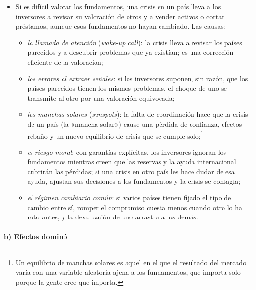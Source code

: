 \documentclass[11pt]{article}
\begin{document}
\begin{itemize}
\item Si es difícil valorar los fundamentos, una crisis en un país lleva a los inversores a revisar su valoración de otros y a vender activos o cortar préstamos, aunque esos fundamentos no hayan cambiado. Las causas:
  \begin{itemize}
  \item \emph{la llamada de atención} (\emph{wake-up call}): la crisis lleva a revisar los países parecidos y a descubrir problemas que ya existían; es una corrección eficiente de la valoración;
  \item \emph{los errores al extraer señales}: si los inversores suponen, sin razón, que los países parecidos tienen los mismos problemas, el choque de uno se transmite al otro por una valoración equivocada;
  \item \emph{las manchas solares} (\emph{sunspots}): la falta de coordinación hace que la crisis de un país (la «mancha solar») cause una pérdida de confianza, efectos rebaño y un nuevo equilibrio de crisis que se cumple solo;\footnote{Un \href{https://es.wikipedia.org/wiki/Equilibrio_de_manchas_solares}{equilibrio de manchas solares} es aquel en el que el resultado del mercado varía con una variable aleatoria ajena a los fundamentos, que importa solo porque la gente cree que importa.}
  \item \emph{el riesgo moral}: con garantías explícitas, los inversores ignoran los fundamentos mientras creen que las reservas y la ayuda internacional cubrirán las pérdidas; si una crisis en otro país les hace dudar de esa ayuda, ajustan sus decisiones a los fundamentos y la crisis se contagia;
  \item \emph{el régimen cambiario común}: si varios países tienen fijado el tipo de cambio entre sí, romper el compromiso cuesta menos cuando otro lo ha roto antes, y la devaluación de uno arrastra a los demás.
  \end{itemize}
\end{itemize}

\paragraph{b) Efectos dominó}
\end{document}
